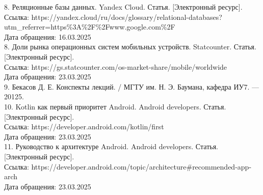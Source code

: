 \hspace{-1.25cm}
8. Реляционные базы данных. Yandex Cloud. Статья. [Электронный ресурс]. \\
Ссылка: https://yandex.cloud/ru/docs/glossary/relational-databases?utm\_referrer=https\%3A\%2F\%2Fwww.google.com\%2F \\
Дата обращения: 16.03.2025 \\

\hspace{-1.25cm}
8. Доли рынка операционных систем мобильных устройств. Statcounter. Статья. [Электронный ресурс]. \\
Ссылка: https://gs.statcounter.com/os-market-share/mobile/worldwide \\
Дата обращения: 23.03.2025 \\

\hspace{-1.25cm}
9. Бекасов Д. Е. Конспекты лекций. / МГТУ им. Н. Э. Баумана, кафедра ИУ7. --- 20125. \\

\hspace{-1.25cm}
10. Kotlin как первый приоритет Android. Android developers. Статья. [Электронный ресурс]. \\
Ссылка: https://developer.android.com/kotlin/first \\
Дата обращения: 23.03.2025 \\

\hspace{-1.25cm}
11. Руководство к архитектуре Android. Android developers. Статья. [Электронный ресурс]. \\
Ссылка: https://developer.android.com/topic/architecture#recommended-app-arch \\
Дата обращения: 23.03.2025 \\
